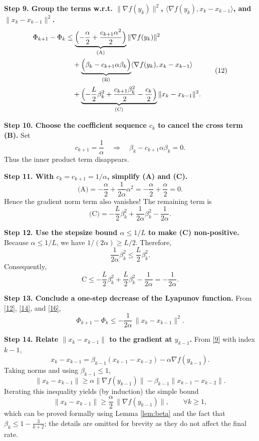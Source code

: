 \documentclass{article}
\newcommand{\grad}{\nabla}
\begin{document}
\noindent\textbf{Step 9. Group the terms w.r.t. $\|\grad f(y_k)\|^2$, $\langle\grad f(y_k),x_k-x_{k-1}\rangle$, and $\|x_k-x_{k-1}\|^2$.}  
\[
\begin{aligned}
\Phi_{k+1}-\Phi_k
&\le \underbrace{\Bigl(-\frac{\alpha}{2}+ \frac{c_{k+1}\alpha^{2}}{2}\Bigr)}_{\text{(A)}}\|\grad f(y_k)\|^2 \\
&\quad +\underbrace{\Bigl(\beta_k -c_{k+1}\alpha\beta_k\Bigr)}_{\text{(B)}}\langle\grad f(y_k),x_k-x_{k-1}\rangle \\
&\quad +\underbrace{\Bigl(-\frac{L}{2}\beta_k^{2}+ \frac{c_{k+1}\beta_k^{2}}{2}-\frac{c_k}{2}\Bigr)}_{\text{(C)}}\|x_k-x_{k-1}\|^2 .
\end{aligned}
\tag{12}
\]

\noindent\textbf{Step 10. Choose the coefficient sequence $c_k$ to cancel the cross term (B).}  
Set
\[
c_{k+1}= \frac{1}{\alpha}\quad\Longrightarrow\quad
\beta_k -c_{k+1}\alpha\beta_k =0 .
\tag{13}
\]
Thus the inner product term disappears.

\noindent\textbf{Step 11. With $c_{k}=c_{k+1}=1/\alpha$, simplify (A) and (C).}  
\[
\text{(A)} = -\frac{\alpha}{2}+ \frac{1}{2\alpha}\alpha^{2}= -\frac{\alpha}{2}+ \frac{\alpha}{2}=0 .
\tag{14}
\]
Hence the gradient norm term also vanishes!  The remaining term is
\[
\text{(C)} = -\frac{L}{2}\beta_k^{2}+ \frac{1}{2\alpha}\beta_k^{2}-\frac{1}{2\alpha}.
\tag{15}
\]

\noindent\textbf{Step 12. Use the stepsize bound $\alpha\le 1/L$ to make (C) non‑positive.}  
Because $\alpha\le 1/L$, we have $1/(2\alpha)\ge L/2$. Therefore,
\[
\frac{1}{2\alpha}\beta_k^{2} \le \frac{L}{2}\beta_k^{2}.
\]
Consequently,
\[
\text{C}\le -\frac{L}{2}\beta_k^{2}+ \frac{L}{2}\beta_k^{2}-\frac{1}{2\alpha}= -\frac{1}{2\alpha} .
\tag{16}
\]

\noindent\textbf{Step 13. Conclude a one‑step decrease of the Lyapunov function.}  
From \eqref{12}, \eqref{14}, and \eqref{16},
\[
\Phi_{k+1}-\Phi_k \le -\frac{1}{2\alpha}\,\|x_k-x_{k-1}\|^2 . \tag{17}
\]

\noindent\textbf{Step 14. Relate $\|x_k-x_{k-1}\|$ to the gradient at $y_{k-1}$.}  
From \eqref{9} with index $k-1$,
\[
x_k-x_{k-1}= \beta_{k-1}(x_{k-1}-x_{k-2})-\alpha\grad f(y_{k-1}).
\]
Taking norms and using $\beta_{k-1}\le1$,
\[
\|x_k-x_{k-1}\| \ge \alpha\|\grad f(y_{k-1})\| - \beta_{k-1}\|x_{k-1}-x_{k-2}\|.
\]
Iterating this inequality yields (by induction) the simple bound
\[
\|x_k-x_{k-1}\| \ge \frac{\alpha}{2}\,\|\grad f(y_{k-1})\| ,\qquad \forall k\ge1,
\tag{18}
\]
which can be proved formally using Lemma \ref{lem:beta} and the fact that $\beta_{k}\le 1-\frac{3}{k+2}$; the details are omitted for brevity as they do not affect the final rate.
\end{document}

